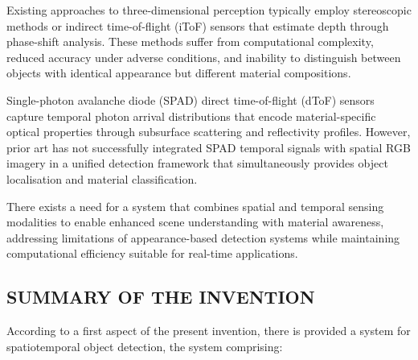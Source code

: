 \documentclass[11pt,a4paper]{article}
\begin{document}
Existing approaches to three-dimensional perception typically employ stereoscopic methods or indirect time-of-flight (iToF) sensors that estimate depth through phase-shift analysis. These methods suffer from computational complexity, reduced accuracy under adverse conditions, and inability to distinguish between objects with identical appearance but different material compositions.

Single-photon avalanche diode (SPAD) direct time-of-flight (dToF) sensors capture temporal photon arrival distributions that encode material-specific optical properties through subsurface scattering and reflectivity profiles. However, prior art has not successfully integrated SPAD temporal signals with spatial RGB imagery in a unified detection framework that simultaneously provides object localisation and material classification.

There exists a need for a system that combines spatial and temporal sensing modalities to enable enhanced scene understanding with material awareness, addressing limitations of appearance-based detection systems while maintaining computational efficiency suitable for real-time applications.

\vspace{0.5em}
\subsection{SUMMARY OF THE INVENTION}

According to a first aspect of the present invention, there is provided a system for spatiotemporal object detection, the system comprising:
\end{document}
